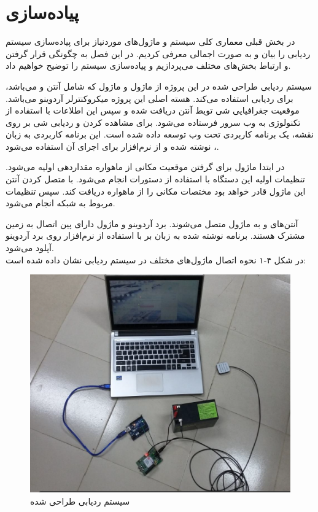 \chapter{پیاده‌سازی}
در بخش قبلی معماری کلی سیستم و ماژول‌های موردنیاز برای پیاده‌سازی سیستم ردیابی را بیان و به صورت اجمالی معرفی کردیم. در این فصل به چگونگی قرار گرفتن و ارتباط بخش‌های مختلف می‌پردازیم و پیاده‌سازی سیستم را توضیح خواهیم داد.


سیستم ردیابی طراحی شده در این پروژه از ماژول  و ماژول  که شامل آنتن  و  می‌باشد، برای ردیابی استفاده می‌کند. هسته اصلی این پروژه میکروکنترلر آردوینو می‌باشد. موقعیت جغرافیایی شی تویط آنتن  دریافت شده و سپس این اطلاعات با استفاده از تکنولوژی  به وب سرور فرستاده می‌شود. برای مشاهده کردن و ردیابی شی بر روی نقشه، یک برنامه کاربردی تحت وب توسعه داده شده است. این برنامه کاربردی به زبان ،  نوشته شده و از نرم‌افزار  برای اجرای آن استفاده می‌شود.
 
 
در ابتدا ماژول  برای گرفتن موقعیت مکانی از ماهواره مقداردهی اولیه می‌شود. تنظیمات اولیه این دستگاه با استفاده از دستورات  انجام می‌شود. با متصل کردن آنتن  این ماژول قادر خواهد بود مختصات مکانی را از ماهواره دریافت کند. سپس تنظیمات مربوط به شبکه  انجام می‌شود.


آنتن‌های  و  به ماژول  متصل می‌شوند. برد آردوینو و ماژول  دارای پین اتصال به زمین مشترک هستند. برنامه نوشته شده به زبان  بر با استفاده از نرم‌افزار  روی برد آردوینو آپلود می‌شود.
\\
در شکل ۴-۱ نحوه اتصال ماژول‌های مختلف در سیستم ردیابی نشان داده شده است:
\begin{figure}[!h]
	\centerline{\includegraphics[width=.6\textwidth]{design-system}}
	\caption{سیستم ردیابی طراحی شده}
\end{figure}